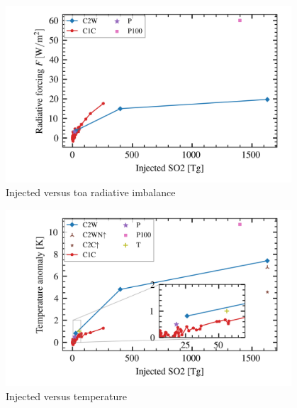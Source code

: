 \documentclass{ametsocV5}
\begin{document}
\begin{figure}
  \begin{center}
    \includegraphics[width=0.95\textwidth]{figures/injection_vs_toa.png}
  \end{center}
  \caption{Injected  versus \acrshort{toa} radiative imbalance}
  \label{fig:so2_vs_toa}
\end{figure}

\begin{figure}
  \begin{center}
    \includegraphics[width=0.95\textwidth]{figures/injection_vs_temperature.png}
  \end{center}
  \caption{Injected  versus temperature}
  \label{fig:so2_vs_temp}
\end{figure}
\end{document}
